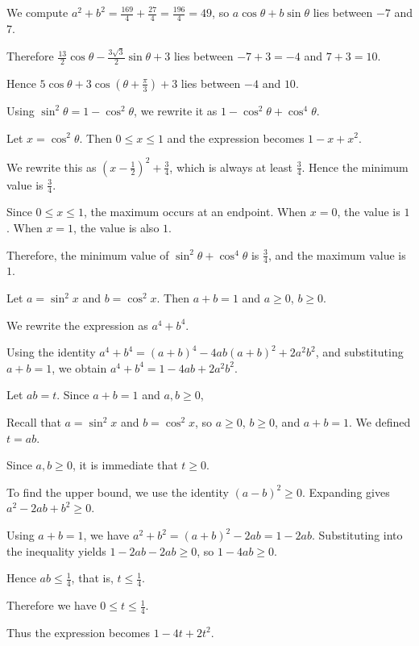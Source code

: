   We compute
  $a^2 + b^2 = \frac{169}{4} + \frac{27}{4} = \frac{196}{4} = 49$,
  so
  $a \cos \theta + b \sin \theta$
  lies between $-7$ and $7$.

  Therefore
  $\frac{13}{2} \cos \theta - \frac{3\sqrt3}{2} \sin \theta + 3$
  lies between $-7 + 3 = -4$ and $7 + 3 = 10$.

  Hence
  $5 \cos \theta + 3 \cos(\theta + \frac{\pi}{3}) + 3$
  lies between $-4$ and $10$.
\item Using $\sin^2 \theta = 1 - \cos^2 \theta$, we rewrite it as
  $1 - \cos^2 \theta + \cos^4 \theta$.

  Let $x = \cos^2 \theta$.
  Then $0 \le x \le 1$ and the expression becomes
  $1 - x + x^2$.

  We rewrite this as
  $\left(x - \frac12\right)^2 + \frac34$,
  which is always at least $\frac34$.
  Hence the minimum value is $\frac34$.

  Since $0 \le x \le 1$, the maximum occurs at an endpoint.
  When $x = 0$, the value is $1$.
  When $x = 1$, the value is also $1$.

  Therefore, the minimum value of $\sin^2 \theta + \cos^4 \theta$ is $\frac34$,
  and the maximum value is $1$.
\item Let $a = \sin^2 x$ and $b = \cos^2 x$.
  Then $a + b = 1$ and $a \ge 0$, $b \ge 0$.

  We rewrite the expression as
  $a^4 + b^4$.

  Using the identity
  $a^4 + b^4 = (a + b)^4 - 4ab(a + b)^2 + 2a^2 b^2$,
  and substituting $a + b = 1$, we obtain
  $a^4 + b^4 = 1 - 4ab + 2a^2 b^2$.

  Let $ab = t$.
  Since $a + b = 1$ and $a,b \ge 0$,

  Recall that $a = \sin^2 x$ and $b = \cos^2 x$, so $a \ge 0$, $b \ge 0$, and
  $a + b = 1$.
  We defined $t = ab$.

  Since $a,b \ge 0$, it is immediate that $t \ge 0$.

  To find the upper bound, we use the identity
  $(a - b)^2 \ge 0$.
  Expanding gives
  $a^2 - 2ab + b^2 \ge 0$.

  Using $a + b = 1$, we have
  $a^2 + b^2 = (a + b)^2 - 2ab = 1 - 2ab$.
  Substituting into the inequality yields
  $1 - 2ab - 2ab \ge 0$,
  so
  $1 - 4ab \ge 0$.

  Hence
  $ab \le \frac14$,
  that is,
  $t \le \frac14$.

  Therefore we have
  $0 \le t \le \frac14$.

  Thus the expression becomes
  $1 - 4t + 2t^2$.

